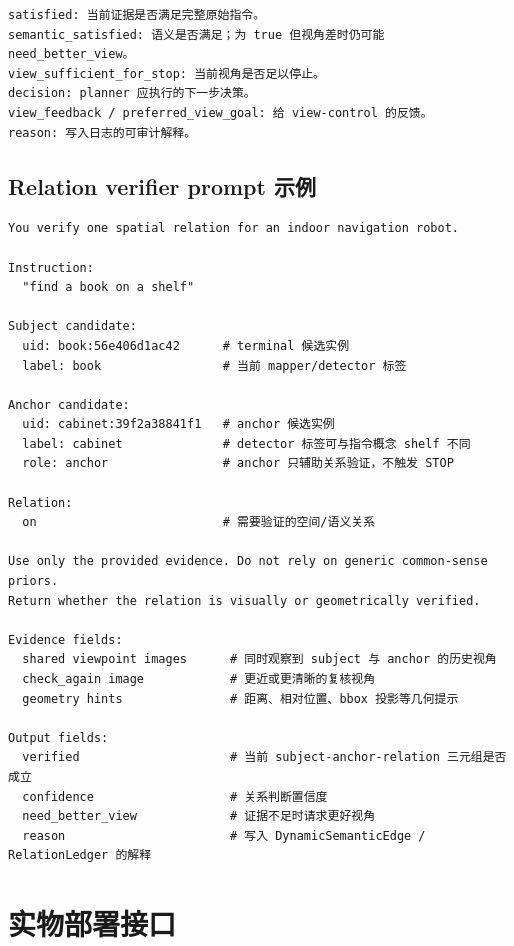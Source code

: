 \documentclass[UTF8,zihao=-4]{ctexart}
\begin{document}
\begin{lstlisting}[style=pseudo,caption={Final verifier 输出字段说明}]
satisfied: 当前证据是否满足完整原始指令。
semantic_satisfied: 语义是否满足；为 true 但视角差时仍可能 need_better_view。
view_sufficient_for_stop: 当前视角是否足以停止。
decision: planner 应执行的下一步决策。
view_feedback / preferred_view_goal: 给 view-control 的反馈。
reason: 写入日志的可审计解释。
\end{lstlisting}

\subsection{Relation verifier prompt 示例}

\begin{lstlisting}[style=pseudo,caption={Relation verifier prompt 片段}]
You verify one spatial relation for an indoor navigation robot.

Instruction:
  "find a book on a shelf"

Subject candidate:
  uid: book:56e406d1ac42      # terminal 候选实例
  label: book                 # 当前 mapper/detector 标签

Anchor candidate:
  uid: cabinet:39f2a38841f1   # anchor 候选实例
  label: cabinet              # detector 标签可与指令概念 shelf 不同
  role: anchor                # anchor 只辅助关系验证，不触发 STOP

Relation:
  on                          # 需要验证的空间/语义关系

Use only the provided evidence. Do not rely on generic common-sense priors.
Return whether the relation is visually or geometrically verified.

Evidence fields:
  shared viewpoint images      # 同时观察到 subject 与 anchor 的历史视角
  check_again image            # 更近或更清晰的复核视角
  geometry hints               # 距离、相对位置、bbox 投影等几何提示

Output fields:
  verified                     # 当前 subject-anchor-relation 三元组是否成立
  confidence                   # 关系判断置信度
  need_better_view             # 证据不足时请求更好视角
  reason                       # 写入 DynamicSemanticEdge / RelationLedger 的解释
\end{lstlisting}

\section{实物部署接口}
\end{document}

